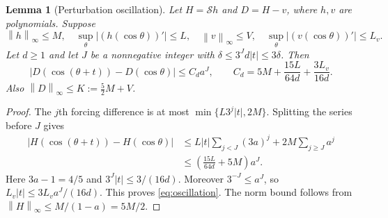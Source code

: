 \documentclass[11pt]{article}
\newtheorem{lemma}[theorem]{Lemma}
\theoremstyle{remark}\newtheorem{remark}[theorem]{Remark}
\newcommand{\norm}[1]{\left\|#1\right\|_\infty}
\begin{document}
\begin{lemma}[Perturbation oscillation]\label{lem:oscillation}
Let $H=\mathcal S h$ and $D=H-v$, where $h,v$ are polynomials. Suppose
\[
 \norm h\le M,\quad
 \sup_\theta|(h(\cos\theta))'|\le L,\quad
 \norm v\le V,\quad
 \sup_\theta|(v(\cos\theta))'|\le L_v.
\]
Let $d\ge1$ and let $J$ be a nonnegative integer with
$\delta\le3^Jd|t|\le3\delta$. Then
\begin{equation}\label{eq:oscillation}
 |D(\cos(\theta+t))-D(\cos\theta)|\le C_d a^J,
 \qquad
 C_d=5M+\frac{15L}{64d}+\frac{3L_v}{16d}.
\end{equation}
Also $\norm D\le K:=\frac52M+V$.
\end{lemma}
\begin{proof}
The $j$th forcing difference is at most
$\min\{L3^j|t|,2M\}$. Splitting the series before $J$ gives
\begin{align*}
 |H(\cos(\theta+t))-H(\cos\theta)|
 &\le L|t|\sum_{j<J}(3a)^j+2M\sum_{j\ge J}a^j\\
 &\le\left(\frac{15L}{64d}+5M\right)a^J.
\end{align*}
Here $3a-1=4/5$ and $3^J|t|\le3/(16d)$.
Moreover $3^{-J}\le a^J$, so
$L_v|t|\le3L_va^J/(16d)$. This proves \eqref{eq:oscillation}.
The norm bound follows from $\norm H\le M/(1-a)=5M/2$.
\end{proof}
\end{document}
